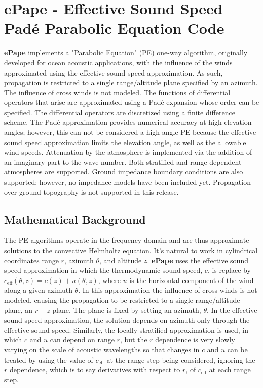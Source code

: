 \section{ePape - Effective Sound Speed Pad\'e Parabolic Equation Code}
\label{sec: ePape}

{\bf ePape} implements a "Parabolic Equation" (PE)\cite{collins2019parabolic} one-way algorithm, originally developed for ocean acoustic applications, with the influence of the winds approximated using the effective sound speed approximation. As such, propagation is restricted to a single range/altitude plane specified by an azimuth. The influence of cross winds is not modeled. The functions of differential operators that arise are approximated using a Pad\'e expansion whose order can be specified. The differential operators are discretized using a finite difference scheme. The Pad\'e approximation provides numerical accuracy at high elevation angles; however, this can not be considered a high angle PE because the effective sound speed approximation limits the elevation angle, as well as the allowable wind speeds. Attenuation by the atmosphere is implemented via the addition of an imaginary part to the wave number. Both stratified and range dependent atmospheres are supported. Ground impedance boundary conditions are also supported; however, no impedance models have been included yet. Propagation over ground topography is not supported in this release.

\subsection{Mathematical Background}
The PE algorithms operate in the frequency domain and are thus approximate solutions to the convective Helmholtz equation. It's natural to work in cylindrical coordinates range $r$, azimuth $\theta$, and altitude $z$. {\bf ePape} uses the effective sound speed approximation\cite{waxler2019propagation} in which the thermodynamic sound speed, $c$, is replace by $c_{\text{eff}}(\theta,z)=c(z)+u(\theta,z)$, where $u$ is the horizontal component of the wind along a given azimuth $\theta$. In this approximation the influence of cross winds is not modeled, causing the propagation to be restricted to a single range/altitude plane, an $r-z$ plane. The plane is fixed by setting an azimuth, $\theta$. In the effective sound speed approximation, the solution depends on azimuth only through the effective sound speed. Similarly, the locally stratified approximation is used, in which $c$ and $u$ can depend on range $r$, but the $r$ dependence is very slowly varying on the scale of acoustic wavelengths so that changes in $c$ and $u$ can be treated by using the value of $c_{\text{eff}}$ at the range step being considered, ignoring the $r$ dependence, which is to say derivatives with respect to $r$, of $c_{\text{eff}}$ at each range step. 


